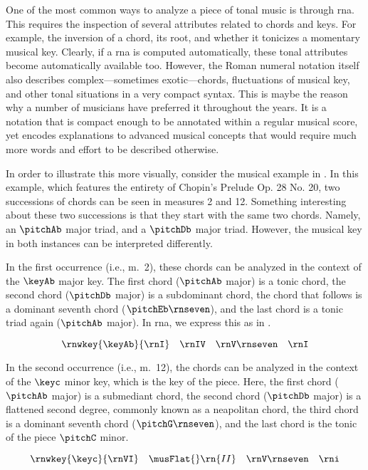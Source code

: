 
One of the most common ways to analyze a piece of tonal
music is through \gls{rna}. This requires the inspection of
several attributes related to chords and keys. For example,
the inversion of a chord, its root, and whether it tonicizes
a momentary musical key. Clearly, if a \gls{rna} is computed
automatically, these tonal attributes become automatically
available too. However, the Roman numeral notation itself
also describes complex---sometimes exotic---chords,
fluctuations of musical key, and other tonal situations in a
very compact syntax. This is maybe the reason why a number
of musicians have preferred it throughout the years. It is a
notation that is compact enough to be annotated within a
regular musical score, yet encodes explanations to advanced
musical concepts that would require much more words and
effort to be described otherwise.

In order to illustrate this more visually, consider the
musical example in . In this
example, which features the entirety of Chopin's Prelude Op.
28 No. 20, two successions of chords can be seen in measures
2 and 12. Something interesting about these two successions
is that they start with the same two chords. Namely, an
$\pitchAb$ major triad, and a $\pitchDb$ major triad.
However, the musical key in both instances can be
interpreted differently. 

In the first occurrence (i.e., m.~2), these chords can be
analyzed in the context of the $\keyAb$ major key. The first
chord ($\pitchAb$ major) is a tonic chord, the second chord
($\pitchDb$ major) is a subdominant chord, the chord that
follows is a dominant seventh chord ($\pitchEb\rnseven$),
and the last chord is a tonic triad again ($\pitchAb$
major). In \gls{rna}, we express this as in
.

\begin{equation}
    \label{eq:succession1}
    \rnwkey{\keyAb}{\rnI} \quad \rnIV \quad \rnV\rnseven \quad \rnI
\end{equation}

In the second occurrence (i.e., m.~12), the chords can be
analyzed in the context of the $\keyc$ minor key, which is
the key of the piece. Here, the first chord ($\pitchAb$
major) is a submediant chord, the second chord ($\pitchDb$
major) is a flattened second degree, commonly known as a
\gls{neapolitan} chord, the third chord is a dominant
seventh chord ($\pitchG\rnseven$), and the last chord is the
tonic of the piece $\pitchC$ minor.

\begin{equation}
    \label{eq:succession2}
    \rnwkey{\keyc}{\rnVI} \quad \musFlat{}\rn{II} \quad \rnV\rnseven \quad \rni
\end{equation}

